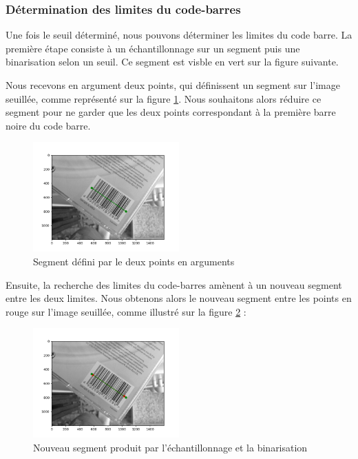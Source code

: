 \documentclass{rapport}
\begin{document}
\subsubsection*{Détermination des limites du code-barres}
Une fois le seuil déterminé, nous pouvons déterminer les limites du code barre.
La première étape consiste à un échantillonnage sur un segment puis une binarisation selon un seuil. Ce segment est visble en vert sur la figure suivante.

Nous recevons en argument deux points, qui définissent un segment sur l'image seuillée, comme représenté sur la figure \ref{fig:segment}.
Nous souhaitons alors réduire ce segment pour ne garder que les deux points correspondant à la première barre noire du code barre.

\begin{figure}[H] 
	\centering
	\includegraphics[width=0.5\textwidth]{images/code_barre_couple_vert.png}
	\caption{Segment défini par le deux points en arguments}
	\label{fig:segment}
\end{figure}

Ensuite, la recherche des limites du code-barres amènent à un nouveau segment entre les deux limites. 
Nous obtenons alors le nouveau segment entre les points en rouge sur l'image seuillée, comme illustré sur la figure \ref{fig:binarisation} : 

\begin{figure}[H] 
	\centering
	\includegraphics[width=0.5\textwidth]{images/binarisation.png}
	\caption{Nouveau segment produit par l'échantillonnage et la binarisation}
	\label{fig:binarisation}
\end{figure}
\end{document}
